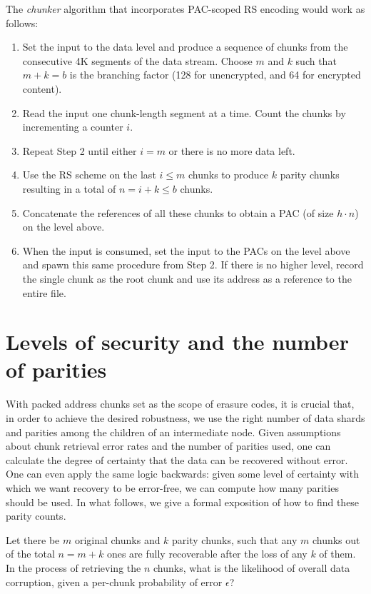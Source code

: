 \documentclass[manuscript,screen,review]{acmart}
\begin{document}
The \emph{chunker} algorithm that incorporates PAC-scoped RS encoding would work as follows:
\begin{enumerate}[noitemsep]
\item Set the input to the data level and produce a sequence of chunks from the consecutive 4K segments of the data stream. Choose $m$ and $k$ such that $m+k=b$ is the branching factor (128 for unencrypted, and 64 for encrypted content).
\item Read the input one chunk-length segment at a time. Count the chunks by incrementing a counter $i$.
\item Repeat Step 2 until either $i = m$ or there is no more data left.
\item Use the RS scheme on the last $i\leq m$ chunks to produce $k$ parity chunks resulting in a total of $n = i+k \leq b$ chunks.
\item Concatenate the references of all these chunks to obtain a PAC (of size $h\cdot n$) on the level above.
\item When the input is consumed, set the input to the PACs on the level above and spawn this same procedure from Step 2. If there is no higher level, record the single chunk as the root chunk and use its address as a reference to the entire file.
\end{enumerate}



\section{Levels of security and the number of parities}\label{sec:levels}

With packed address chunks set as the scope of erasure codes, it is crucial that, in order to achieve the desired robustness, we use the right number of data shards and parities among the children of an intermediate node.
Given assumptions about chunk retrieval error rates and the number of parities used, one can calculate the degree of certainty that the data can be recovered without error. One can even apply the same logic backwards: given some level of certainty with which we want recovery to be error-free, we can compute how many parities should be used.
In what follows, we give a formal exposition of how to find these parity counts.


Let there be $m$ original chunks and $k$ parity chunks, such that any $m$ chunks out of the total $n = m + k$ ones are fully recoverable after the loss of any $k$ of them. In the process of retrieving the $n$ chunks, what is the likelihood of overall data corruption, given a per-chunk probability of error $\epsilon$?
\end{document}
